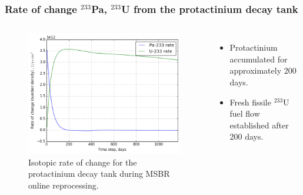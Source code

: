 \begin{frame}
  \frametitle{Rate of change $^{233}$Pa, $^{233}$U from the protactinium decay tank}
    \begin{columns}
    \column[t]{8cm}
   \vspace{-0.35in}
  \begin{figure}[t]
   \includegraphics[height=0.8\textheight]{./images/rates_outflow.png}
   \vspace{-0.12in}
   \caption{Isotopic rate of change for the protactinium decay tank during MSBR online reprocessing.}
    \end{figure}

    \column[t]{4cm}
        \begin{itemize}
        \item Protactinium accumulated for approximately 200 days.
   		\item Fresh fissile $^{233}$U fuel flow established after 200 days.
   	  \end{itemize}
     \end{columns}
\end{frame}

